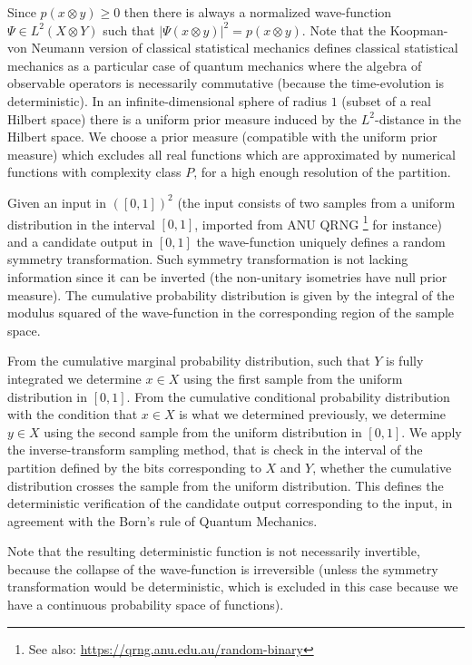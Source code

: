 \documentclass[11pt,a4paper]{report}
\begin{document}
Since \(p(x\otimes y)\geq 0\) then there is always a normalized
wave-function \(\Psi\in L^2(X\otimes Y)\) such that
\(|\Psi(x\otimes y)|^2=p(x\otimes y)\). Note that the Koopman-von
Neumann version of classical statistical
mechanics\cite{Sudarshan1976Interaction} defines classical statistical mechanics as a particular case of
quantum mechanics where the algebra of observable operators is
necessarily commutative (because the time-evolution is deterministic).
In an infinite-dimensional sphere of radius \(1\) (subset of a real
Hilbert space) there is a uniform prior measure induced by the
\(L^2\)-distance in the Hilbert space. We choose a prior measure
(compatible with the uniform prior measure) which excludes all real
functions which are approximated by numerical functions with complexity
class \(P\), for a high enough resolution of the partition.

Given an input in \(([0,1])^2\) (the input consists of two samples from
a uniform distribution in the interval \([0,1]\), imported from ANU QRNG
\cite{PhysRevApplied.3.054004}\footnote{See also: \url{https://qrng.anu.edu.au/random-binary}}
for instance) and a candidate output in \([0,1]\) the wave-function
uniquely defines a random symmetry transformation. Such symmetry
transformation is not lacking information since it can be inverted (the
non-unitary isometries have null prior measure). The cumulative
probability distribution is given by the integral of the modulus squared
of the wave-function in the corresponding region of the sample space.

From the cumulative marginal probability distribution, such that \(Y\)
is fully integrated we determine \(x\in X\) using the first sample from
the uniform distribution in \([0,1]\). From the cumulative conditional
probability distribution with the condition that \(x\in X\) is what we
determined previously, we determine \(y\in X\) using the second sample
from the uniform distribution in \([0,1]\). We apply the
inverse-transform sampling
method\cite{Rubinstein2016Simulation}, that is check in the interval of the partition defined by
the bits corresponding to \(X\) and \(Y\), whether the cumulative
distribution crosses the sample from the uniform distribution. This
defines the deterministic verification of the candidate output
corresponding to the input, in agreement with the Born's rule of Quantum
Mechanics.

Note that the resulting deterministic function is not necessarily
invertible, because the collapse of the wave-function is irreversible
(unless the symmetry transformation would be deterministic, which is
excluded in this case because we have a continuous probability space of
functions).
\end{document}
